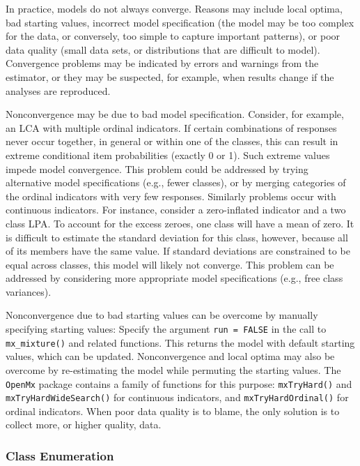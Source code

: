 \documentclass[
  ,man,floatsintext]{apa6}
\begin{document}
In practice, models do not always converge. Reasons may include local
optima, bad starting values, incorrect model specification (the model
may be too complex for the data, or conversely, too simple to capture
important patterns), or poor data quality (small data sets, or
distributions that are difficult to model). Convergence problems may be
indicated by errors and warnings from the estimator, or they may be
suspected, for example, when results change if the analyses are
reproduced.

Nonconvergence may be due to bad model specification. Consider, for
example, an LCA with multiple ordinal indicators. If certain
combinations of responses never occur together, in general or within one
of the classes, this can result in extreme conditional item
probabilities (exactly 0 or 1). Such extreme values impede model
convergence. This problem could be addressed by trying alternative model
specifications (e.g., fewer classes), or by merging categories of the
ordinal indicators with very few responses. Similarly problems occur
with continuous indicators. For instance, consider a zero-inflated
indicator and a two class LPA. To account for the excess zeroes, one
class will have a mean of zero. It is difficult to estimate the standard
deviation for this class, however, because all of its members have the
same value. If standard deviations are constrained to be equal across
classes, this model will likely not converge. This problem can be
addressed by considering more appropriate model specifications (e.g.,
free class variances).

Nonconvergence due to bad starting values can be overcome by manually
specifying starting values: Specify the argument \texttt{run\ =\ FALSE} in the
call to \texttt{mx\_mixture()} and related functions. This returns the model
with default starting values, which can be updated. Nonconvergence and
local optima may also be overcome by re-estimating the model while
permuting the starting values. The \texttt{OpenMx} package contains a family of
functions for this purpose: \texttt{mxTryHard()} and \texttt{mxTryHardWideSearch()}
for continuous indicators, and \texttt{mxTryHardOrdinal()} for ordinal
indicators. When poor data quality is to blame, the only solution is to
collect more, or higher quality, data.

\hypertarget{class-enumeration}{%
\subsubsection{Class Enumeration}\label{class-enumeration}}
\end{document}
